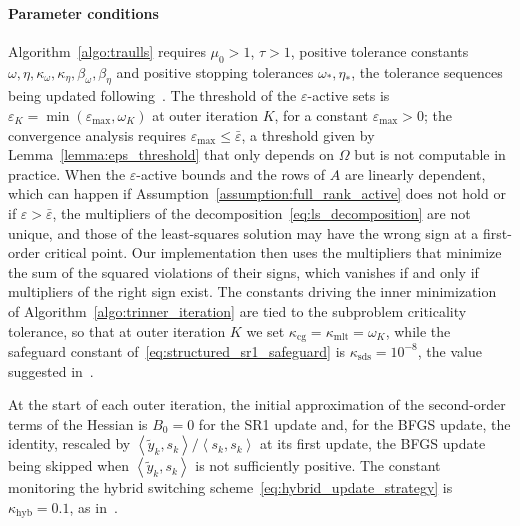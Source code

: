 \documentclass{article}
\numberwithin{equation}{section}
\newcommand{\inner}[2]{\left\langle {#1} , {#2} \right\rangle} %
\theoremstyle{plain}
\begin{document}
\paragraph*{Parameter conditions} 
Algorithm~\ref{algo:traulls} requires $\mu_0 > 1$, $\tau > 1$, positive tolerance constants $\omega,\eta,\kappa_\omega,\kappa_\eta,\beta_\omega,\beta_\eta$ and positive stopping tolerances $\omega_*,\eta_*$, the tolerance sequences being updated following~\cite[Algorithm~14.4.2]{conn-etal:2000}. The threshold of the $\varepsilon$-active sets is $\varepsilon_K = \min(\varepsilon_{\max},\omega_K)$ at outer iteration $K$, for a constant $\varepsilon_{\max} > 0$; the convergence analysis requires $\varepsilon_{\max} \le \bar\varepsilon$, a threshold given by Lemma~\ref{lemma:eps_threshold} that only depends on $\Omega$ but is not computable in practice. When the $\varepsilon$-active bounds and the rows of $A$ are linearly dependent, which can happen if Assumption~\ref{assumption:full_rank_active} does not hold or if $\varepsilon > \bar\varepsilon$, the multipliers of the decomposition~\eqref{eq:ls_decomposition} are not unique, and those of the least-squares solution may have the wrong sign at a first-order critical point. Our implementation then uses the multipliers that minimize the sum of the squared violations of their signs, which vanishes if and only if multipliers of the right sign exist. The constants driving the inner minimization of Algorithm~\ref{algo:trinner_iteration} are tied to the subproblem criticality tolerance, so that at outer iteration $K$ we set $\kappa_{\mathrm{cg}} = \kappa_{\mathrm{mlt}} = \omega_K$, while the safeguard constant of~\eqref{eq:structured_sr1_safeguard} is $\kappa_{\mathrm{sds}} = 10^{-8}$, the value suggested in~\cite[Section~6.2]{nocedalwright:2006}.

At the start of each outer iteration, the initial approximation of the second-order terms of the Hessian is $B_0 = 0$ for the SR1 update and, for the BFGS update, the identity, rescaled by $\inner{\tilde{y}_k}{s_k}/\inner{s_k}{s_k}$ at its first update, the BFGS update being skipped when $\inner{\tilde{y}_k}{s_k}$ is not sufficiently positive. The constant monitoring the hybrid switching scheme~\eqref{eq:hybrid_update_strategy} is $\kappa_{\mathrm{hyb}} = 0.1$, as in~\cite{tjoabiegler:1991}.
\end{document}

